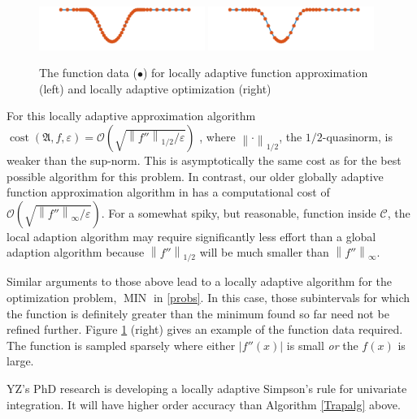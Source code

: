 \documentclass[11pt]{NSFamsart}
\DeclareMathOperator{\cost}{cost}
\DeclareMathOperator{\OPT}{MIN}
\newcommand{\cc}{\mathcal{C}}
\newcommand{\fA}{\mathfrak{A}}
\newcommand{\norm}[2][{}]{\ensuremath{\left \lVert #2 \right \rVert}_{#1}}
\newcommand{\Order}{\mathcal{O}}
\begin{document}
\begin{figure}[h]
	\centering
	\vspace{-1ex}
	\includegraphics[width = 0.48\textwidth]{ProgramsImages/sampling-funappxg.png}
	\includegraphics[width = 0.48\textwidth]{ProgramsImages/sampling-funming.png}
	
	\vspace{-2ex}
	\caption{The function data ({\color{MATLABOrange}$\bullet$}) for  locally adaptive 
	function approximation  (left) and locally adaptive optimization (right) \label{localadaptfig}}
\end{figure}


For this locally adaptive approximation algorithm 
$\cost(\fA,f,\varepsilon) = \Order\left(\sqrt{\norm[1/2]{f''}/\varepsilon} \right)$ \cite{ChoEtal17a}, 
where 
$\norm[1/2]{\cdot}$, the $1/2$-quasinorm, is weaker than the sup-norm.  This is  
asymptotically the same cost as for the best possible algorithm for this problem. In contrast, 
our older globally adaptive function approximation algorithm in \cite{HicEtal14b} has a 
computational cost of $\Order\left(\sqrt{\norm[\infty]{f''}/\varepsilon} \right)$.  For a somewhat 
spiky, but reasonable, 
function inside $\cc$, the local adaption algorithm may require significantly less effort 
than a global adaption algorithm because $\norm[1/2]{f''}$ will be much smaller than 
$\norm[\infty]{f''}$.

Similar arguments to those above lead to a locally adaptive algorithm for the 
optimization problem, $\OPT$ in \eqref{probs}.  In this case, those subintervals for which the 
function is definitely greater than the minimum found so far need not be 
refined further.  Figure 
\ref{localadaptfig} (right) gives an example of the function data required.  The function is 
sampled sparsely where either $|f''(x)|$ is small \emph{or} the $f(x)$ is large.

YZ's PhD research is developing a locally 
adaptive Simpson's rule for univariate integration.  It will have higher order accuracy than Algorithm 
\ref{Trapalg} above.  
\end{document}

